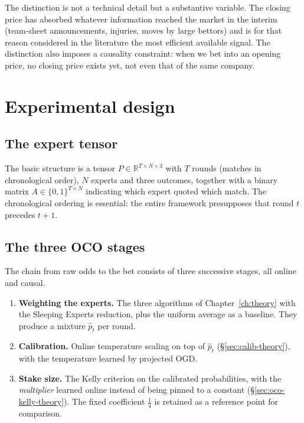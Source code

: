 \documentclass[12pt,a4paper,oneside]{report}
\renewcommand{\_}{\oldunderscore\allowbreak}
\theoremstyle{definition}
\theoremstyle{plain}
\theoremstyle{definition}   %
\begin{document}
The distinction is not a technical detail but a substantive variable. The closing price has
absorbed whatever information reached the market in the interim (team-sheet announcements,
injuries, moves by large bettors) and is for that reason considered in the literature the most
efficient available signal. The distinction also imposes a causality constraint: when we bet
into an opening price, no closing price exists yet, not even that of the same company.

\section{Experimental design}

\subsection{The expert tensor}

The basic structure is a tensor $P \in \mathbb{R}^{T \times N \times 3}$ with $T$ rounds
(matches in chronological order), $N$ experts and three outcomes, together with a binary matrix
$A \in \{0,1\}^{T \times N}$ indicating which expert quoted which match. The chronological
ordering is essential: the entire framework presupposes that round $t$ precedes $t+1$.

\subsection{The three OCO stages}

The chain from raw odds to the bet consists of three successive stages, all online and causal.

\begin{enumerate}
  \item \textbf{Weighting the experts.} The three algorithms of Chapter~\ref{ch:theory} with the
        Sleeping Experts reduction, plus the uniform average as a baseline. They produce a
        mixture $\hat{p}_t$ per round.
  \item \textbf{Calibration.} Online temperature scaling on top of $\hat{p}_t$
        (\S\ref{sec:calib-theory}), with the temperature learned by projected OGD.
  \item \textbf{Stake size.} The Kelly criterion on the calibrated probabilities, with the
        \emph{multiplier} learned online instead of being pinned to a constant
        (\S\ref{sec:oco-kelly-theory}). The fixed coefficient $\tfrac14$ is retained as a
        reference point for comparison.
\end{enumerate}
\end{document}
